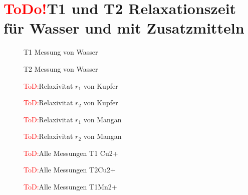 \section{\textcolor{red}{ToDo!}T1 und T2 Relaxationszeit für Wasser und mit Zusatzmitteln}
 

\begin{figure}[H]
    \centering
    
    \caption{T1 Messung von Wasser}
\end{figure}

\begin{figure}[H]
    \centering
    
    \caption{T2 Messung von Wasser}
\end{figure}

\begin{figure}[H]
    \centering
    
    \caption{\textcolor{red}{ToD:}Relaxivitat $r_1$ von Kupfer}
    \label{fig:RelaxCUT1}
\end{figure}

\begin{figure}[H]
    \centering
    
    \caption{\textcolor{red}{ToD:}Relaxivitat $r_2$ von Kupfer}
    \label{fig:RelaxCUT2}
\end{figure}

\begin{figure}[H]
    \centering
    
    \caption{\textcolor{red}{ToD:}Relaxivitat $r_1$ von Mangan}
    \label{fig:RelaxMNT1}
\end{figure}

\begin{figure}[H]
    \centering
    
    \caption{\textcolor{red}{ToD:}Relaxivitat $r_2$ von Mangan}
    \label{fig:RelaxMNT2}
\end{figure}

\begin{figure}[H]
    \centering
    
    \caption{\textcolor{red}{ToD:}Alle Messungen T1 Cu2+}
    \label{fig:T1CU}
\end{figure}

\begin{figure}[H]
    \centering
    
    \caption{\textcolor{red}{ToD:}Alle Messungen T2Cu2+}
    \label{fig:T2CU}
\end{figure}

\begin{figure}[H]
    \centering
    
    \caption{\textcolor{red}{ToD:}Alle Messungen T1Mn2+}
    \label{fig:T1Mn}
\end{figure}

